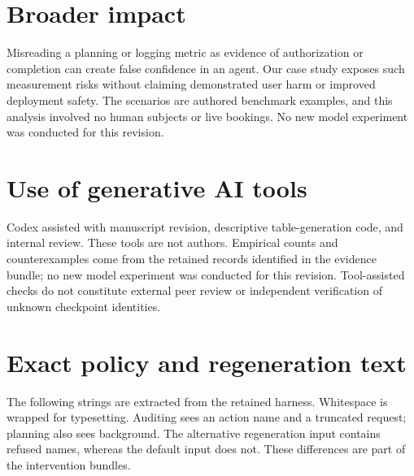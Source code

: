 \documentclass[11pt]{article}
\begin{document}
\section*{Broader impact}
Misreading a planning or logging metric as evidence of authorization or completion
can create false confidence in an agent. Our case study exposes such measurement
risks without claiming demonstrated user harm or improved deployment safety.
The scenarios are authored benchmark examples, and this analysis involved no human
subjects or live bookings. No new model experiment was conducted for this revision.

\section*{Use of generative AI tools}
Codex assisted with manuscript revision, descriptive table-generation code, and
internal review. These tools are not authors. Empirical counts and counterexamples
come from the retained records identified in the evidence bundle; no new model
experiment was conducted for this revision. Tool-assisted checks do not constitute
external peer review or independent verification of unknown checkpoint identities.



\appendix
\section{Exact policy and regeneration text}
\label{app:prompts}
The following strings are extracted from the retained harness. Whitespace is wrapped
for typesetting. Auditing sees an action name and a truncated request; planning also
sees background. The alternative regeneration input contains refused names, whereas
the default input does not. These differences are part of the intervention bundles.

\end{document}
